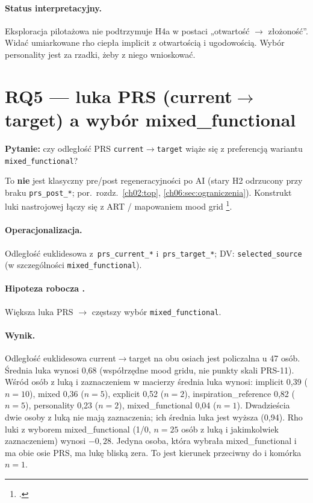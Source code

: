 \paragraph{Status interpretacyjny.}
Eksploracja pilotażowa nie podtrzymuje H4a w postaci „otwartość $\rightarrow$ złożoność”. Widać umiarkowane rho ciepła implicit z otwartością i ugodowością. Wybór personality jest za rzadki, żeby z niego wnioskować.

\section{RQ5 --- luka PRS (current$\rightarrow$target) a wybór mixed\_functional}
\label{ch08:sec:rq5}

\textbf{Pytanie:} czy odległość PRS \texttt{current}$\rightarrow$\texttt{target} wiąże się z preferencją wariantu \texttt{mixed\_functional}?

To \textbf{nie} jest klasyczny pre/post regeneracyjności po AI (stary H2 odrzucony przy braku \texttt{prs\_post\_*}; por.\ rozdz.~\ref{ch02:top}, \ref{ch06:sec:ograniczenia}).
Konstrukt luki nastrojowej łączy się z ART / mapowaniem mood grid \footcite{kaplan1995restorative}.

\paragraph{Operacjonalizacja.}
Odległość euklidesowa z~\texttt{prs\_current\_*} i~\texttt{prs\_target\_*}; DV: \texttt{selected\_source} (w szczególności \texttt{mixed\_functional}).

\paragraph{Hipoteza robocza .}
Większa luka PRS $\rightarrow$ częstszy wybór \texttt{mixed\_functional}.

\paragraph{Wynik.}
Odległość euklidesowa current$\rightarrow$target na obu osiach jest policzalna u 47 osób. Średnia luka wynosi 0,68 (współrzędne mood gridu, nie punkty skali PRS-11).
Wśród osób z luką i zaznaczeniem w macierzy średnia luka wynosi: implicit 0,39 ($n=10$), mixed 0,36 ($n=5$), explicit 0,52 ($n=2$), inspiration\_reference 0,82 ($n=5$), personality 0,23 ($n=2$), mixed\_functional 0,04 ($n=1$). Dwadzieścia dwie osoby z luką nie mają zaznaczenia; ich średnia luka jest wyższa (0,94).
Rho luki z wyborem mixed\_functional (1/0, $n=25$ osób z luką i jakimkolwiek zaznaczeniem) wynosi $-0{,}28$. Jedyna osoba, która wybrała mixed\_functional i ma obie osie PRS, ma lukę bliską zera. To jest kierunek przeciwny do  i komórka $n=1$.

